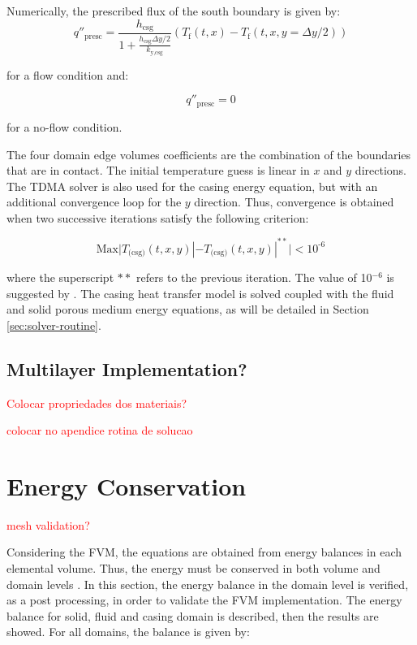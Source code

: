 \documentclass[review,preprint,12pt]{elsarticle}
\begin{document}
Numerically, the prescribed flux of the south boundary is given by:
\begin{equation}
q''_\textrm{presc} = \frac{h_\textrm{csg}}{1+\frac{h_\textrm{csg}\Delta y/2}{k_\textrm{y,csg}}}(T_\textrm{f}(t,x)-T_\textrm{f}(t,x,y=\Delta y/2))
\end{equation}

\noindent for a flow condition and:

\begin{equation}
q''_\textrm{presc} = 0
\end{equation}

\noindent for a no-flow condition.

The four domain edge volumes coefficients are the combination of the boundaries that are in contact. The initial temperature guess is linear in $x$ and $y$ directions. The TDMA solver is also used for the casing energy equation, but with an additional convergence loop for the $y$ direction. Thus, convergence is obtained when two successive iterations satisfy the following criterion:

\begin{equation}
\textrm{Max} \bigg| T_\textrm{(csg)}(t,x,y)| - T_\textrm{(csg)}(t,x,y)|^{**} \bigg| < 10^\textrm{-6} 
\end{equation}

\noindent where the superscript $**$ refers to the previous iteration. The value of 10$^{-6}$ is suggested by \cite{Trevizoli2015}. The casing heat transfer model is solved coupled with the fluid and solid porous medium energy equations, as will be detailed in Section \ref{sec:solver-routine}.


\subsection{Multilayer Implementation?}

\textcolor{red}{Colocar propriedades dos materiais?}

\textcolor{red}{colocar no apendice rotina de solucao}



\section{Energy Conservation}
\textcolor{red}{mesh validation?}

Considering the FVM, the equations are obtained from energy balances in each elemental volume. Thus, the energy must be conserved in both volume and domain levels \cite{Maliska2004}. In this section, the energy balance in the domain level is verified, as a post processing, in order to validate the FVM implementation. The energy balance for solid, fluid and casing domain is described, then the results are showed. For all domains, the balance is given by:
\end{document}
